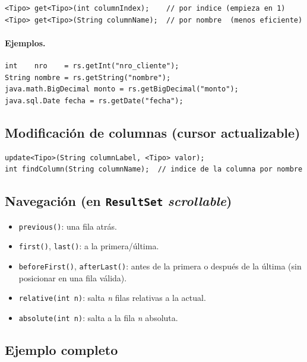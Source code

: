 \documentclass[11pt,a4paper]{article}
\begin{document}
\begin{lstlisting}
<Tipo> get<Tipo>(int columnIndex);    // por indice (empieza en 1)
<Tipo> get<Tipo>(String columnName);  // por nombre  (menos eficiente)
\end{lstlisting}

\paragraph{Ejemplos.}

\begin{lstlisting}
int    nro    = rs.getInt("nro_cliente");
String nombre = rs.getString("nombre");
java.math.BigDecimal monto = rs.getBigDecimal("monto");
java.sql.Date fecha = rs.getDate("fecha");
\end{lstlisting}

\subsection*{Modificación de columnas (cursor actualizable)}

\begin{lstlisting}
update<Tipo>(String columnLabel, <Tipo> valor);
int findColumn(String columnName);  // indice de la columna por nombre
\end{lstlisting}

\subsection*{Navegación (en \texttt{ResultSet} \emph{scrollable})}

\begin{itemize}
    \item \texttt{previous()}: una fila atrás.
    \item \texttt{first()}, \texttt{last()}: a la primera/última.
    \item \texttt{beforeFirst()}, \texttt{afterLast()}: antes de la
    primera o después de la última (sin posicionar en una fila
    válida).
    \item \texttt{relative(int n)}: salta \emph{n} filas relativas a
    la actual.
    \item \texttt{absolute(int n)}: salta a la fila \emph{n}
    absoluta.
\end{itemize}

\subsection*{Ejemplo completo}
\end{document}
